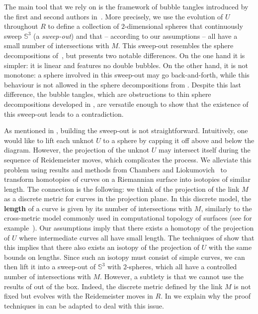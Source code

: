 \documentclass[10pt,a4paper]{amsart}
\newcommand{\Sp}{\mathbb{S}}
\begin{document}
The main tool that we rely on is the framework of bubble tangles introduced by the first and second authors in~\cite{Lunel_spherewidth_out}. More precisely, we use the evolution of $U$ throughout $R$ to define a collection of $2$-dimensional spheres that continuously sweep $\Sp^3$ (a \textit{sweep-out}) and that -- according to our assumptions -- all have a small number of intersections with $M$. This sweep-out resembles the sphere decompositions of~\cite{Lunel_spherewidth_out}, but presents two notable differences. On the one hand it is simpler: it is linear and features no double bubbles. On the other hand, it is not monotone: a sphere involved in this sweep-out may go back-and-forth, while this behaviour is not allowed in the sphere decompositions from \cite{Lunel_spherewidth_out}. Despite this last difference, the bubble tangles, which are obstructions to thin sphere decompositions developed in \cite{Lunel_spherewidth_out}, are versatile enough to show that the existence of this sweep-out leads to a contradiction.

As mentioned in , building the sweep-out is not straightforward. Intuitively, one would like to lift each unknot $U$ to a sphere by capping it off above and below the diagram. However, the projection of the unknot $U$ may intersect itself during the sequence of Reidemeister moves, which complicates the process.
We alleviate this problem using results and methods from Chambers and Liokumovich~\cite{Chambers_homo-isotopy} to transform homotopies of curves on a Riemannian surface into isotopies of similar length. The connection is the following: we think of the projection of the link $M$ as a discrete metric for curves in the projection plane. In this discrete model, the \textbf{length} of a curve is given by its number of intersections with $M$, similarly to the cross-metric model commonly used in computational topology of surfaces (see for example~\cite{de2010tightening}). Our assumptions imply that there exists a homotopy of the projection of $U$ where intermediate curves all have small length. The techniques of \cite{Chambers_homo-isotopy} show that this implies that there also exists an isotopy of the projection of $U$ with the same bounds on lengths. Since such an isotopy must consist of simple curves, we can then lift it into a sweep-out of $\Sp^3$ with $2$-spheres, which all have a controlled number of intersections with $M$. However, a subtlety is that we cannot use the results of \cite{Chambers_homo-isotopy} out of the box. Indeed, the discrete metric defined by the link $M$ is not fixed but evolves with the Reidemeister moves in $R$. In  we explain why the proof techniques in \cite{Chambers_homo-isotopy} can be adapted to deal with this issue.
\end{document}
